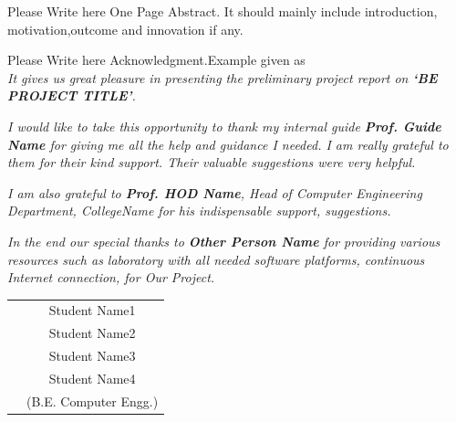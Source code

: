\documentclass[oneside,a4paper,12pt]{report}
\begin{document}
{   \setlength{\parindent}{11mm} }
{ \setlength{\parindent}{0mm} }
Please Write here One Page Abstract. It should mainly include introduction, motivation,outcome and innovation if any.


{   \setlength{\parindent}{11mm} }
{ \setlength{\parindent}{0mm} }
Please Write here Acknowledgment.Example given as\\
\textit{It gives us great pleasure in presenting the preliminary project report
on {\bfseries \fontsize{12}{12} \selectfont `BE PROJECT TITLE'}.}
\vspace*{1.5\baselineskip}

 \textit{I would like to take this opportunity to thank my internal guide
 \textbf{Prof. Guide Name} for giving me all the help and guidance I needed. I am
 really grateful to them for their kind support. Their valuable suggestions were very helpful.} \vspace*{1.5\baselineskip}

 \textit{I am also grateful to \textbf{Prof. HOD Name}, Head of Computer
 Engineering Department, CollegeName for his indispensable
 support, suggestions.}
\vspace*{1.5\baselineskip}

\textit{In the end our special thanks to \textbf{Other Person Name} for
providing various resources such as  laboratory with all needed software platforms,
continuous Internet connection, for Our Project.}
\vspace*{3\baselineskip} \\
\begin{tabular}{p{8.2cm}c}
&Student Name1\\
&Student Name2\\
&Student Name3\\
&Student Name4\\
&(B.E. Computer Engg.)
\end{tabular}


\tableofcontents
\listoffigures
\listoftables



\mainmatter
\end{document}
